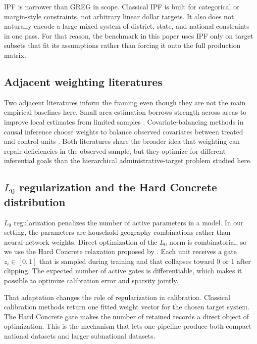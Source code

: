 IPF is narrower than GREG in scope. Classical IPF is built for categorical or margin-style
constraints, not arbitrary linear dollar targets. It also does not naturally encode a large mixed
system of district, state, and national constraints in one pass. For that reason, the benchmark in
this paper uses IPF only on target subsets that fit its assumptions rather than forcing it onto the
full production matrix.

\subsection{Adjacent weighting literatures}

Two adjacent literatures inform the framing even though they are not the main empirical baselines
here. Small area estimation borrows strength across areas to improve local estimates from limited
samples \citep{anderson2013}. Covariate-balancing methods in causal inference choose weights to
balance observed covariates between treated and control units \citep{imai2014}. Both literatures
share the broader idea that weighting can repair deficiencies in the observed sample, but they
optimize for different inferential goals than the hierarchical administrative-target problem studied
here.

\subsection{\texorpdfstring{$L_0$}{L0} regularization and the Hard Concrete distribution}

$L_0$ regularization penalizes the number of active parameters in a model. In our setting, the
parameters are household-geography combinations rather than neural-network weights. Direct
optimization of the $L_0$ norm is combinatorial, so we use the Hard Concrete relaxation proposed by
\citet{louizos2018}. Each unit receives a gate $z_i \in [0, 1]$ that is sampled during training and
that collapses toward 0 or 1 after clipping. The expected number of active gates is differentiable,
which makes it possible to optimize calibration error and sparsity jointly.

That adaptation changes the role of regularization in calibration. Classical calibration methods
return one fitted weight vector for the chosen target system. The Hard Concrete gate makes the
number of retained records a direct object of optimization. This is the mechanism that lets one
pipeline produce both compact national datasets and larger subnational datasets.

